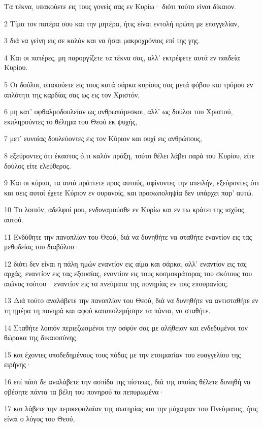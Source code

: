 \par Τα τέκνα, υπακούετε εις τους γονείς σας εν Κυρίω· διότι τούτο είναι δίκαιον.
\par 2 Τίμα τον πατέρα σου και την μητέρα, ήτις είναι εντολή πρώτη με επαγγελίαν,
\par 3 διά να γείνη εις σε καλόν και να ήσαι μακροχρόνιος επί της γης.
\par 4 Και οι πατέρες, μη παροργίζετε τα τέκνα σας, αλλ' εκτρέφετε αυτά εν παιδεία Κυρίου.
\par 5 Οι δούλοι, υπακούετε εις τους κατά σάρκα κυρίους σας μετά φόβου και τρόμου εν απλότητι της καρδίας σας ως εις τον Χριστόν,
\par 6 μη κατ' οφθαλμοδουλείαν ως ανθρωπάρεσκοι, αλλ' ως δούλοι του Χριστού, εκπληρούντες το θέλημα του Θεού εκ ψυχής,
\par 7 μετ' ευνοίας δουλεύοντες εις τον Κύριον και ουχί εις ανθρώπους,
\par 8 εξεύροντες ότι έκαστος ό,τι καλόν πράξη, τούτο θέλει λάβει παρά του Κυρίου, είτε δούλος είτε ελεύθερος.
\par 9 Και οι κύριοι, τα αυτά πράττετε προς αυτούς, αφίνοντες την απειλήν, εξεύροντες ότι και σεις αυτοί έχετε Κύριον εν ουρανοίς, και προσωποληψία δεν υπάρχει παρ' αυτώ.
\par 10 Το λοιπόν, αδελφοί μου, ενδυναμούσθε εν Κυρίω και εν τω κράτει της ισχύος αυτού.
\par 11 Ενδύθητε την πανοπλίαν του Θεού, διά να δυνηθήτε να σταθήτε εναντίον εις τας μεθοδείας του διαβόλου·
\par 12 διότι δεν είναι η πάλη ημών εναντίον εις αίμα και σάρκα, αλλ' εναντίον εις τας αρχάς, εναντίον εις τας εξουσίας, εναντίον εις τους κοσμοκράτορας του σκότους του αιώνος τούτου· εναντίον εις τα πνεύματα της πονηρίας εν τοις επουρανίοις.
\par 13 Διά τούτο αναλάβετε την πανοπλίαν του Θεού, διά να δυνηθήτε να αντισταθήτε εν τη ημέρα τη πονηρά και αφού καταπολεμήσητε τα πάντα, να σταθήτε.
\par 14 Σταθήτε λοιπόν περιεζωσμένοι την οσφύν σας με αλήθειαν και ενδεδυμένοι τον θώρακα της δικαιοσύνης
\par 15 και έχοντες υποδεδημένους τους πόδας με την ετοιμασίαν του ευαγγελίου της ειρήνης·
\par 16 επί πάσι δε αναλάβετε την ασπίδα της πίστεως, διά της οποίας θέλετε δυνηθή να σβέσητε πάντα τα βέλη του πονηρού τα πεπυρωμένα·
\par 17 και λάβετε την περικεφαλαίαν της σωτηρίας και την μάχαιραν του Πνεύματος, ήτις είναι ο λόγος του Θεού,
